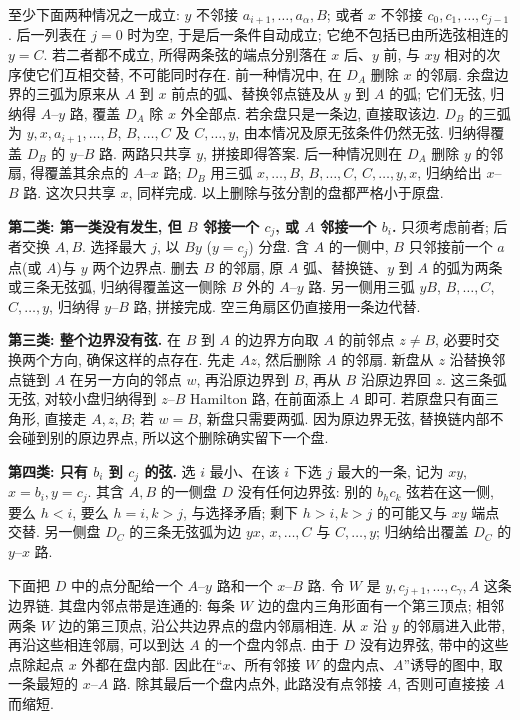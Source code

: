 \begin{solution}
至少下面两种情况之一成立:
$y$ 不邻接 $a_{i+1},\ldots,a_\alpha,B$;
或者 $x$ 不邻接 $c_0,c_1,\ldots,c_{j-1}$.
后一列表在 $j=0$ 时为空, 于是后一条件自动成立;
它绝不包括已由所选弦相连的 $y=C$.
若二者都不成立, 所得两条弦的端点分别落在 $x$ 后、$y$ 前,
与 $xy$ 相对的次序使它们互相交替, 不可能同时存在.
前一种情况中, 在 $D_A$ 删除 $x$ 的邻扇.
余盘边界的三弧为原来从 $A$ 到 $x$ 前点的弧、替换邻点链及从 $y$ 到 $A$ 的弧;
它们无弦, 归纳得 $A$--$y$ 路, 覆盖 $D_A$ 除 $x$ 外全部点.
若余盘只是一条边, 直接取该边.
$D_B$ 的三弧为 $y,x,a_{i+1},\ldots,B$, $B,\ldots,C$ 及 $C,\ldots,y$,
由本情况及原无弦条件仍然无弦.
归纳得覆盖 $D_B$ 的 $y$--$B$ 路. 两路只共享 $y$, 拼接即得答案.
后一种情况则在 $D_A$ 删除 $y$ 的邻扇, 得覆盖其余点的 $A$--$x$ 路;
$D_B$ 用三弧 $x,\ldots,B$, $B,\ldots,C$, $C,\ldots,y,x$,
归纳给出 $x$--$B$ 路. 这次只共享 $x$, 同样完成.
以上删除与弦分割的盘都严格小于原盘.

\textbf{第二类: 第一类没有发生, 但 $B$ 邻接一个 $c_j$, 或 $A$ 邻接一个 $b_i$.}
只须考虑前者; 后者交换 $A,B$.
选择最大 $j$, 以 $By$ ($y=c_j$) 分盘.
含 $A$ 的一侧中, $B$ 只邻接前一个 $a$ 点(或 $A$)与 $y$ 两个边界点.
删去 $B$ 的邻扇, 原 $A$ 弧、替换链、$y$ 到 $A$ 的弧为两条或三条无弦弧,
归纳得覆盖这一侧除 $B$ 外的 $A$--$y$ 路.
另一侧用三弧 $yB$, $B,\ldots,C$, $C,\ldots,y$,
归纳得 $y$--$B$ 路, 拼接完成. 空三角扇区仍直接用一条边代替.

\textbf{第三类: 整个边界没有弦.}
在 $B$ 到 $A$ 的边界方向取 $A$ 的前邻点 $z\ne B$,
必要时交换两个方向, 确保这样的点存在.
先走 $Az$, 然后删除 $A$ 的邻扇.
新盘从 $z$ 沿替换邻点链到 $A$ 在另一方向的邻点 $w$,
再沿原边界到 $B$, 再从 $B$ 沿原边界回 $z$.
这三条弧无弦, 对较小盘归纳得到 $z$--$B$ Hamilton 路,
在前面添上 $A$ 即可. 若原盘只有面三角形, 直接走 $A,z,B$;
若 $w=B$, 新盘只需要两弧. 因为原边界无弦,
替换链内部不会碰到别的原边界点, 所以这个删除确实留下一个盘.

\textbf{第四类: 只有 $b_i$ 到 $c_j$ 的弦.}
选 $i$ 最小、在该 $i$ 下选 $j$ 最大的一条, 记为 $xy$, $x=b_i,y=c_j$.
其含 $A,B$ 的一侧盘 $D$ 没有任何边界弦:
别的 $b_hc_k$ 弦若在这一侧, 要么 $h<i$, 要么 $h=i,k>j$,
与选择矛盾; 剩下 $h>i,k>j$ 的可能又与 $xy$ 端点交替.
另一侧盘 $D_C$ 的三条无弦弧为边 $yx$, $x,\ldots,C$ 与 $C,\ldots,y$;
归纳给出覆盖 $D_C$ 的 $y$--$x$ 路.

下面把 $D$ 中的点分配给一个 $A$--$y$ 路和一个 $x$--$B$ 路.
令 $W$ 是 $y,c_{j+1},\ldots,c_\gamma,A$ 这条边界链.
其盘内邻点带是连通的: 每条 $W$ 边的盘内三角形面有一个第三顶点;
相邻两条 $W$ 边的第三顶点, 沿公共边界点的盘内邻扇相连.
从 $x$ 沿 $y$ 的邻扇进入此带, 再沿这些相连邻扇,
可以到达 $A$ 的一个盘内邻点.
由于 $D$ 没有边界弦, 带中的这些点除起点 $x$ 外都在盘内部.
因此在“$x$、所有邻接 $W$ 的盘内点、$A$”诱导的图中,
取一条最短的 $x$--$A$ 路.
除其最后一个盘内点外, 此路没有点邻接 $A$, 否则可直接接 $A$ 而缩短.


\end{solution}

